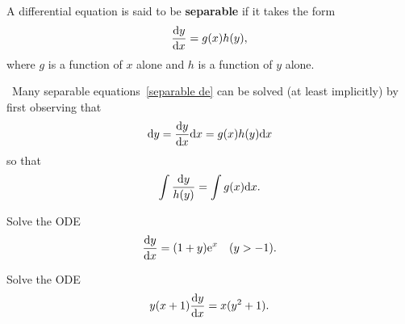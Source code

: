 \newpage

\begin{definition}
A differential equation is said to be \textbf{separable} if it takes the form
\begin{equation}\label{separable de}
\frac{\mathrm{d} y}{\mathrm{d} x} = g(x)h(y),
\end{equation}
where $g$ is a function of $x$ alone and $h$ is a function of $y$ alone.
\end{definition}

\begin{remark}\,
Many separable equations~\eqref{separable de} can be solved (at least implicitly) by first observing that
\begin{equation*}
\mathrm{d} y = \frac{\mathrm{d} y}{\mathrm{d} x}\mathrm{d} x = g(x)h(y)\mathrm{d} x
\end{equation*}
so that
\begin{equation*}
\int\frac{\mathrm{d} y}{h(y)} = \int g(x)\mathrm{d} x.
\end{equation*}
\end{remark}

\begin{example}
Solve the ODE
\begin{equation*}
\frac{\mathrm{d} y}{\mathrm{d} x} = (1+y)\mathrm{e}^x\quad (y>-1).
\end{equation*}
\end{example}

\ifdefined\SOLUTION
{}
\else
\fi
\newpage

\begin{example}
Solve the ODE
\begin{equation*}
y(x+1)\frac{\mathrm{d} y}{\mathrm{d} x} = x(y^2+1).
\end{equation*}
\end{example}

